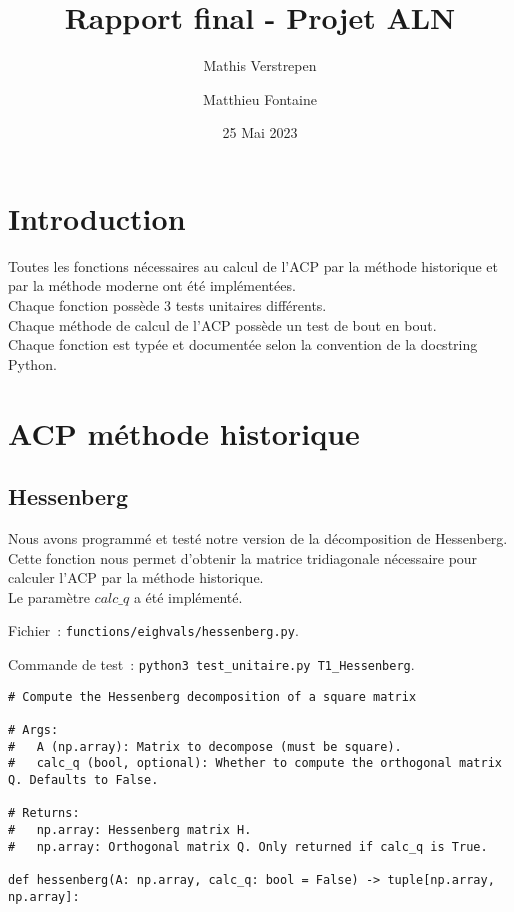 \documentclass{article}
\title{Rapport final - Projet ALN}
\date{25 Mai 2023}
\author{Mathis Verstrepen \and Matthieu Fontaine}
\begin{document}
\maketitle

\section{Introduction}

Toutes les fonctions nécessaires au calcul de l'ACP par la méthode historique et par la méthode moderne ont été implémentées. \\
Chaque fonction possède 3 tests unitaires différents. \\
Chaque méthode de calcul de l'ACP possède un test de bout en bout. \\
Chaque fonction est typée et documentée selon la convention de la docstring Python.

\section{ACP méthode historique}

\subsection{Hessenberg}

Nous avons programmé et testé notre version de la décomposition de Hessenberg. \\
Cette fonction nous permet d'obtenir la matrice tridiagonale nécessaire pour calculer l'ACP par la méthode historique. \\
Le paramètre $calc\_q$ a été implémenté.

Fichier~: \texttt{functions/eighvals/hessenberg.py}.

Commande de test~: \texttt{python3 test\_unitaire.py T1\_Hessenberg}.

\begin{small}
\begin{verbatim}
# Compute the Hessenberg decomposition of a square matrix

# Args:
# 	A (np.array): Matrix to decompose (must be square).
# 	calc_q (bool, optional): Whether to compute the orthogonal matrix Q. Defaults to False.

# Returns:
# 	np.array: Hessenberg matrix H.
# 	np.array: Orthogonal matrix Q. Only returned if calc_q is True.

def hessenberg(A: np.array, calc_q: bool = False) -> tuple[np.array, np.array]:
\end{verbatim}
\end{small}
\end{document}
